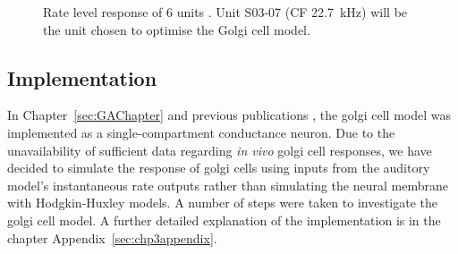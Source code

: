 \begin{figure}[ht!]
  \centering
  \caption{Rate level response of 6 units
    \citep[from~Fig.~2]{GhoshalKim:1997}. Unit S03-07 (CF 22.7~kHz) will be the unit chosen to optimise the Golgi cell model.
  }\label{fig:GolgiKimFig2}
\end{figure}

\subsection{Implementation}

In Chapter~\ref{sec:GAChapter} and previous publications
\citep{EagerGraydenEtAl:2006a}, the golgi cell model was implemented as a
single-compartment conductance neuron. Due to the unavailability of sufficient
data regarding \emph{in vivo} golgi cell responses, we have decided to simulate
the response of golgi cells using inputs from the auditory model's instantaneous
rate outputs rather than simulating the neural membrane with Hodgkin-Huxley
models.  A number of steps were taken to investigate the golgi cell model. A
further detailed explanation of the implementation is in the chapter
Appendix~\ref{sec:chp3appendix}.  \medskip{}

